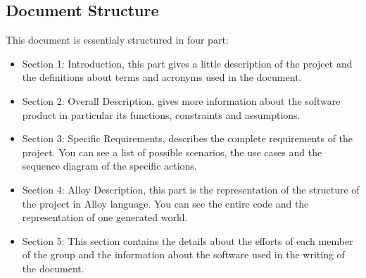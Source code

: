 \subsection{Document Structure}
This document is essentialy structured in four part:
\begin{itemize}
\item
Section 1: Introduction, this part gives a little description of the project and the definitions about terms and acronyms used in the document.
\item
Section 2: Overall Description, gives more information about the software product in particular its functions, constraints and assumptions.
\item
Section 3: Specific Requirements, describes the complete requirements of the project. You can see a list of possible scenarios, the use cases and the sequence diagram of the specific actions.
\item
Section 4: Alloy Description, this part is the representation of the structure of the project in Alloy language. You can see the entire code and the representation of one generated world.
\item
Section 5: This section contains the details about the efforts of each member of the group and the information about the software used in the writing of the document.
\end{itemize}